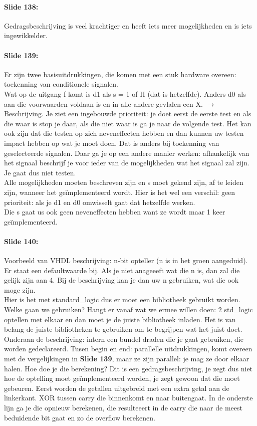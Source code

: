 \documentclass[10pt,a4paper]{book}
\begin{document}
\paragraph{Slide 138:} Gedragsbeschrijving is veel krachtiger en heeft iets meer mogelijkheden en is iets ingewikkelder.

\paragraph{Slide 139:} Er zijn twee basisuitdrukkingen, die komen met een stuk hardware overeen: toekenning van conditionele signalen.\\
Wat op de uitgang f komt is d1 als s = 1 of H (dat is hetzelfde). Anders d0 als aan die voorwaarden voldaan is en in alle andere gevlalen een X. $\rightarrow$ Beschrijving. Je ziet een ingebouwde prioriteit: je doet eerst de eerste test en als die waar is stop je daar, als die niet waar is ga je naar de volgende test. Het kan ook zijn dat die testen op zich neveneffecten hebben en dan kunnen uw testen impact hebben op wat je moet doen. Dat is anders bij toekenning van geselecteerde signalen. Daar ga je op een andere manier werken: afhankelijk van het signaal beschrijf je voor ieder van de mogelijkheden wat het signaal zal zijn. Je gaat dus niet testen.\\
Alle mogelijkheden moeten beschreven zijn en s moet gekend zijn, af te leiden zijn, wanneer het ge\"implementeerd wordt. Hier is het wel een verschil: geen prioriteit: als je d1 en d0 omwisselt gaat dat hetzelfde werken.\\
Die s gaat us ook geen neveneffecten hebben want ze wordt maar 1 keer ge\"implementeerd.

\paragraph{Slide 140:} Voorbeeld van VHDL beschrijving: n-bit opteller (n is in het groen aangeduid). Er staat een defaultwaarde bij. Als je niet anageeeft wat die n is, dan zal die gelijk zijn aan 4. Bij de beschrijving kan je dan uw n gebruiken, wat die ook moge zijn.\\
Hier is het met standard\_logic dus er moet een bibliotheek gebruikt worden. Welke gaan we gebruiken? Hangt er vanaf wat we ermee willen doen: 2 std\_logic optellen met elkaar en dan moet je de juiste bibliotheek inladen. Het is van belang de juiste bibliotheken te gebruiken om te begrijpen wat het juist doet.\\
Onderaan de beschrijving: intern een bundel draden die je gaat gebruiken, die worden gedeclareerd. Tusen begin en end: parallelle uitdrukkingen, komt overeen met de vergelijkingen in \textbf{Slide 139}, maar ze zijn parallel: je mag ze door elkaar halen. Hoe doe je die berekening? Dit is een gedragsbeschrijving, je zegt dus niet hoe de optelling moet ge\"implementeerd worden, je zegt gewoon dat die moet gebeuren. Eerst worden de getallen uitgebreid met een extra getal aan de linkerkant. XOR tussen carry die binnenkomt en naar buitengaat. In de onderste lijn ga je die opnieuw berekenen, die resulteeert in de carry die naar de meest beduidende bit gaat en zo de overflow berekenen.
\end{document}
